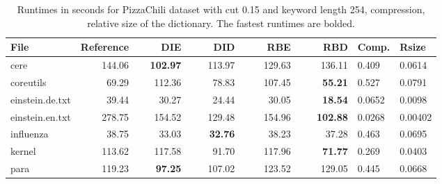 \documentclass[english,twoside,censored,csm,algorithms-track-2020]{HYthesisML}
\theoremstyle{plain}
\theoremstyle{definition}
\numberwithin{testexample}{chapter}
\begin{document}
\begin{center}
  \begin{table}
  \begin{tabular} {| l |r r r r r|l l|}
    \hline
    \textbf{File} & \textbf{Reference} & ~~~~\textbf{DIE} & ~~~~\textbf{DID} & ~~~~\textbf{RBE} & ~~~~\textbf{RBD} & \textbf{Comp.} & \textbf{Rsize} \\
    \hline
    cere & 144.06 & \textbf{102.97} & 113.97 & 129.63 & 136.11            & 0.409  & 0.0614  \\
    coreutils & 69.29 & 112.36 & 78.83 & 107.45 & \textbf{55.21}          & 0.527  & 0.0791  \\
    einstein.de.txt & 39.44 & 30.27 & 24.44 & 30.05 & \textbf{18.54}      & 0.0652 & 0.0098  \\
    einstein.en.txt & 278.75 & 154.52 & 129.48 & 154.96 & \textbf{102.88} & 0.0268 & 0.00402 \\
    influenza & 38.75 & 33.03 & \textbf{32.76} & 38.23 & 37.28            & 0.463  & 0.0695  \\
    kernel & 113.62 & 117.58 & 91.70 & 117.96 & \textbf{71.77}            & 0.269  & 0.0403  \\
    para & 119.23 & \textbf{97.25} & 107.02 & 123.52 & 129.05             & 0.445  & 0.0668  \\
    \hline
  \end{tabular}
  \caption{Runtimes in seconds for PizzaChili dataset with cut 0.15 and keyword length 254, compression, relative size of the dictionary. The fastest runtimes are bolded.}
  \label{runtimes-15-254}
  \end{table}
\end{center}
\end{document}
